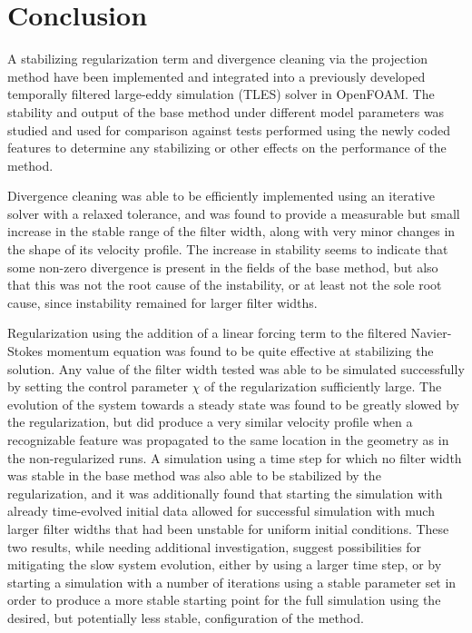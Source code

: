 \chapter{Conclusion}


A stabilizing regularization term and divergence cleaning via the projection method have been implemented and integrated into a previously developed temporally filtered large-eddy simulation (TLES) solver in OpenFOAM. The stability and output of the base method under different model parameters was studied and used for comparison against tests performed using the newly coded features to determine any stabilizing or other effects on the performance of the method.

Divergence cleaning was able to be efficiently implemented using an iterative solver with a relaxed tolerance, and was found to provide a measurable but small increase in the stable range of the filter width, along with very minor changes in the shape of its velocity profile. The increase in stability seems to indicate that some non-zero divergence is present in the fields of the base method, but also that this was not the root cause of the instability, or at least not the sole root cause, since instability remained for larger filter widths.

Regularization using the addition of a linear forcing term to the filtered Navier-Stokes momentum equation was found to be quite effective at stabilizing the solution. Any value of the filter width tested was able to be simulated successfully by setting the control parameter $\chi$ of the regularization sufficiently large. The evolution of the system towards a steady state was found to be greatly slowed by the regularization, but did produce a very similar velocity profile when a recognizable feature was propagated to the same location in the geometry as in the non-regularized runs. A simulation using a time step for which no filter width was stable in the base method was also able to be stabilized by the regularization, and it was additionally found that starting the simulation with already time-evolved initial data allowed for successful simulation with much larger filter widths that had been unstable for uniform initial conditions. These two results, while needing additional investigation, suggest possibilities for mitigating the slow system evolution, either by using a larger time step, or by starting a simulation with a number of iterations using a stable parameter set in order to produce a more stable starting point for the full simulation using the desired, but potentially less stable, configuration of the method.

